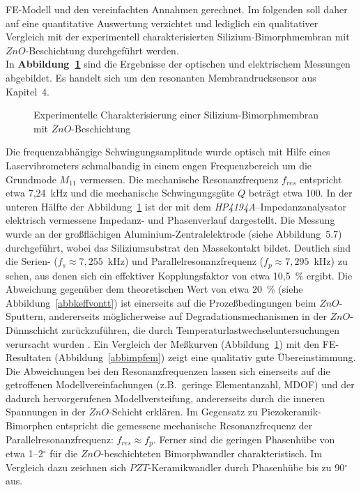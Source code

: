 FE-Modell und den vereinfachten Annahmen gerechnet. Im folgenden soll
daher auf eine quantitative Auswertung verzichtet und lediglich ein
qualitativer Vergleich mit der experimentell charakterisierten
Sili\-zium-Bi\-morph\-mem\-bran mit $ZnO$-Beschichtung durchgeführt
werden. \\
In {\bf Abbildung~\ref{abbimpzno}} sind die Ergebnisse der optischen und
elektrischem Messungen abgebildet. Es handelt sich um den resonanten
Membrandrucksensor aus Kapitel~4.
\begin{figure}[htb]

\begin{center}

\setabbfsea
\end{center}
\caption{\label{abbimpzno}
 Experimentelle Charakterisierung einer Silizium-Bimorphmembran
 mit $ZnO$-Beschichtung}
\end{figure}
Die frequenzabhängige Schwingungsamplitude
wurde optisch mit Hilfe eines Laservibrometers schmalbandig in
einem engen Frequenzbereich um die Grundmode $M_{11}$ vermessen.
Die mechanische Resonanzfrequenz $f_{res}$ entspricht etwa 7,24~kHz und
die mechanische Schwingungsgüte $Q$ beträgt etwa 100.
In der unteren Hälfte der Abbildung~\ref{abbimpzno} ist der mit dem
{\sl HP4194A}--Impedanzanalysator elektrisch vermessene Impedanz- und
Phasenverlauf dargestellt. Die Messung wurde an der großflächigen
Aluminium-Zentralelektrode (siehe Abbildung~5.7) durchgeführt, wobei das
Siliziumsubstrat den Massekontakt bildet. Deutlich sind die Serien-
($f_{s} \approx 7,255$~kHz) und Parallelresonanzfrequenz
($f_{p} \approx 7,295$~kHz) zu sehen, aus denen sich ein effektiver
Kopplungsfaktor von etwa 10,5~\% ergibt. Die Abweichung gegenüber dem
theoretischen Wert von etwa 20~\% (siehe Abbildung~\ref{abbkeffvontt})
ist einerseits auf die Prozeßbedingungen beim $ZnO$-Sputtern, andererseits
möglicherweise auf Degradationsmechanismen in der $ZnO$-Dünnschicht
zurückzuführen, die durch Temperaturlastwechseluntersuchungen verursacht
wurden \cite{Flik}.
Ein Vergleich der Meßkurven (Abbildung~\ref{abbimpzno}) mit den
FE-Resultaten (Abbildung~\ref{abbimpfem}) zeigt eine qualitativ gute
Übereinstimmung. Die Abweichungen bei den Resonanzfrequenzen lassen sich
einerseits auf die getroffenen Modellvereinfachungen (z.B.\ geringe
Elementanzahl, MDOF) und der dadurch hervorgerufenen Modellversteifung,
andererseits durch die inneren Spannungen in der $ZnO$-Schicht erklären.
Im Gegensatz zu Piezokeramik-Bimorphen entspricht die gemessene mechanische
Resonanzfrequenz der Parallelresonanzfrequenz: $f_{res} \approx f_{p}$.
Ferner sind die geringen Phasenhübe von etwa 1--2$^{\circ}$ für die
$ZnO$-beschichteten Bimorphwandler charakteristisch. Im Vergleich dazu
zeichnen sich $PZT$-Keramikwandler durch Phasenhübe bis zu 90$^{\circ}$
aus.


